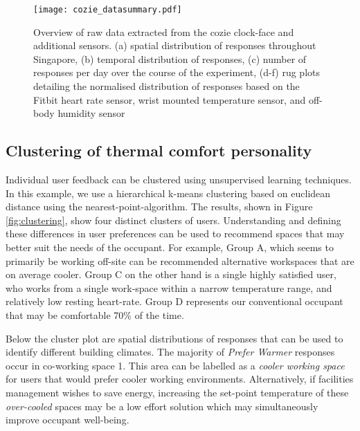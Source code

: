 \begin{figure}
\begin{center}
\texttt{[image: cozie\_datasummary.pdf]}
\caption{Overview of raw data extracted from the cozie clock-face and additional sensors. (a) spatial distribution of responses throughout Singapore, (b) temporal distribution of responses, (c) number of responses per day over the course of the experiment, (d-f) rug plots detailing the normalised distribution of responses based on the Fitbit heart rate sensor, wrist mounted temperature sensor, and off-body humidity sensor }
\label{fig:summary}
\end{center}
\end{figure}



\subsection{Clustering of thermal comfort personality}
\label{ch:userResults}
Individual user feedback can be clustered using unsupervised learning techniques. In this example, we use a hierarchical k-means clustering based on euclidean distance using the nearest-point-algorithm. The results, shown in Figure \ref{fig:clustering}, show four distinct clusters of users. 
Understanding and defining these differences in user preferences can be used to recommend spaces that may better suit the needs of the occupant. For example, Group A, which seems to primarily be working off-site can be recommended alternative workspaces that are on average cooler. Group C on the other hand is a single highly satisfied user, who works from a single work-space within a narrow temperature range, and relatively low resting heart-rate. Group D represents our conventional occupant that may be comfortable 70\% of the time. 

Below the cluster plot are spatial distributions of responses that can be used to identify different building climates. The majority of \emph{Prefer Warmer} responses occur in co-working space 1. This area can be labelled as a \emph{cooler working space} for users that would prefer cooler working environments. Alternatively, if facilities management wishes to save energy, increasing the set-point temperature of these \emph{over-cooled} spaces may be a low effort solution which may simultaneously improve occupant well-being. 



